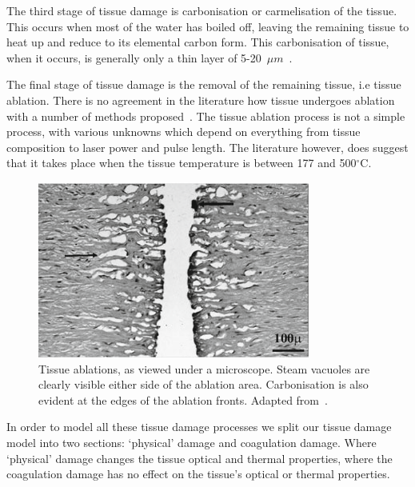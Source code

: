 The third stage of tissue damage is carbonisation or carmelisation of the tissue. This occurs when most of the water has boiled off, leaving the remaining tissue to heat up and reduce to its elemental carbon form. This carbonisation of tissue, when it occurs, is generally only a thin layer of 5-20~$\mu m$~\cite{welch2011optical}.

The final stage of tissue damage is the removal of the remaining tissue, i.e tissue ablation. There is no agreement in the literature how tissue undergoes ablation with a number of methods proposed~\cite{vogel2003mechanisms}. The tissue ablation process is not a simple process, with various unknowns which depend on everything from tissue composition to laser power and pulse length. The literature however, does suggest that it takes place when the tissue temperature is between 177 and 500${^{\circ}}$C\cite{gerstmann1994char,mckenzie1986three}.

\begin{figure}	
\vspace{-10pt}
	\centering
	\includegraphics[width=\columnwidth]{./ablation/images/steam_vacoule.png}
	\caption{Tissue ablations, as viewed under a microscope. Steam vacuoles are clearly visible either side of the ablation area. Carbonisation is also evident at the edges of the ablation fronts. Adapted from~\cite{welch2011optical}.}
	\label{fig:histology}
	\vspace{-10pt}
\end{figure}

In order to model all these tissue damage processes we split our tissue damage model into two sections: `physical' damage and coagulation damage. Where `physical' damage changes the tissue optical and thermal properties, where the coagulation damage has no effect on the tissue's optical or thermal properties.

